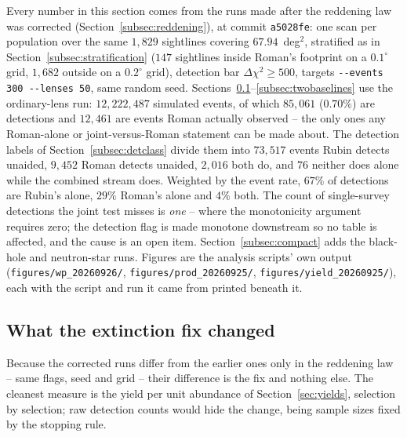 \documentclass[english,10pt,a4paper]{article}
\begin{document}
	Every number in this section comes from the runs made after the reddening law was corrected (Section~\ref{subsec:reddening}), at commit \texttt{a5028fe}: one scan per population over the same $1{,}829$ sightlines covering $67.94$~deg$^2$, stratified as in Section~\ref{subsec:stratification} ($147$ sightlines inside Roman's footprint on a $0.1^{\circ}$ grid, $1{,}682$ outside on a $0.2^{\circ}$ grid), detection bar $\Delta\chi^2\ge500$, targets \texttt{-{}-events 300 -{}-lenses 50}, same random seed. Sections~\ref{subsec:fixeffect}--\ref{subsec:twobaselines} use the ordinary-lens run: $12{,}222{,}487$ simulated events, of which $85{,}061$ ($0.70\%$) are detections and $12{,}461$ are events Roman actually observed -- the only ones any Roman-alone or joint-versus-Roman statement can be made about. The detection labels of Section~\ref{subsec:detclass} divide them into $73{,}517$ events Rubin detects unaided, $9{,}452$ Roman detects unaided, $2{,}016$ both do, and $76$ neither does alone while the combined stream does. Weighted by the event rate, $67\%$ of detections are Rubin's alone, $29\%$ Roman's alone and $4\%$ both. The count of single-survey detections the joint test misses is \emph{one} -- where the monotonicity argument requires zero; the detection flag is made monotone downstream so no table is affected, and the cause is an open item. Section~\ref{subsec:compact} adds the black-hole and neutron-star runs. Figures are the analysis scripts' own output (\texttt{figures/wp\_20260926/}, \texttt{figures/prod\_20260925/}, \texttt{figures/yield\_20260925/}), each with the script and run it came from printed beneath it.

	\subsection{What the extinction fix changed}
	\label{subsec:fixeffect}

	Because the corrected runs differ from the earlier ones only in the reddening law -- same flags, seed and grid -- their difference is the fix and nothing else. The cleanest measure is the yield per unit abundance of Section~\ref{sec:yields}, selection by selection; raw detection counts would hide the change, being sample sizes fixed by the stopping rule.
\end{document}
